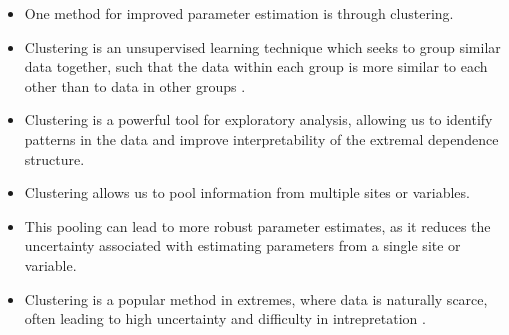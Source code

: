 \documentclass{article}
\numberwithin{equation}{section}
\begin{document}
\begin{itemize}
  \item One method for improved parameter estimation is through clustering.
  \item Clustering is an unsupervised learning technique which seeks to group similar data together, such that the data within each group is more similar to each other than to data in other groups \citep{Hastie2009}.
  \item Clustering is a powerful tool for exploratory analysis, allowing us to identify patterns in the data and improve interpretability of the extremal dependence structure.
  \item Clustering allows us to pool information from multiple sites or variables.
  \item This pooling can lead to more robust parameter estimates, as it reduces the uncertainty associated with estimating parameters from a single site or variable.
  \item Clustering is a popular method in extremes, where data is naturally scarce, often leading to high uncertainty and difficulty in intrepretation \citep{Ferreira2023-mz, Zheng2023-jf}.
\end{itemize}

\vspace{1cm}
\end{document}
